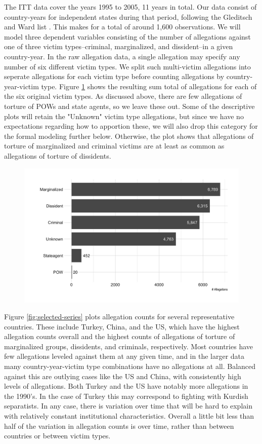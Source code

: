 \documentclass[12pt]{article}
\begin{document}
The ITT data cover the years 1995 to 2005, 11 years in total. Our data consist of country-years for independent states during that period, following the Gleditsch and Ward list \citep{gleditsch:ward:1999}. This makes for a total of around 1,600 observations. We will model three dependent variables consisting of the number of allegations against one of three victim types--criminal, marginalized, and dissident--in a given country-year. In the raw allegation data, a single allegation may specify any number of six different victim types. We split such multi-victim allegations into seperate allegations for each victim type before counting allegations by country-year-victim type. Figure \ref{fig:victim-types} shows the resulting sum total of allegations for each of the six original victim types. As discussed above, there are few allegations of torture of POWs and state agents, so we leave these out. Some of the descriptive plots will retain the "Unknown" victim type allegations, but since we have no expectations regarding how to apportion these, we will also drop this category for the formal modeling further below. Otherwise, the plot shows that allegations of torture of marginalized and criminal victims are at least as common as allegations of torture of dissidents. 

\begin{figure}
\begin{center}
\caption{}
\label{fig:victim-types}
\includegraphics[width=.5\textwidth]{../output/allegations-by-victim.png}
\end{center}
\end{figure}

Figure \ref{fig:selected-series} plots allegation counts for several representative countries. These include Turkey, China, and the US, which have the highest allegation counts overall and the highest counts of allegations of torture of marginalized groups, dissidents, and criminals, respectively. Most countries have few allegations leveled against them at any given time, and in the larger data many country-year-victim type combinations have no allegations at all. Balanced against this are outlying cases like the US and China, with consistently high levels of allegations. Both Turkey and the US have notably more allegations in the 1990's. In the case of Turkey this may correspond to fighting with Kurdish separatists. In any case, there is variation over time that will be hard to explain with relatively constant institutional characteristics. Overall a little bit less than half of the variation in allegation counts is over time, rather than between countries or between victim types. 
\end{document}
